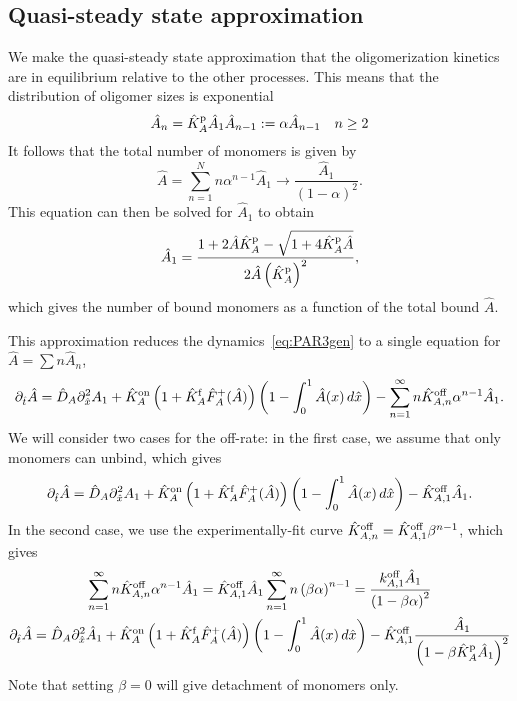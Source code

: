 \documentclass[11pt]{article}
\newcommand{\6}[1]{#1_{\text{6}}}
\newcommand{\3}[1]{#1_{\text{3}}}
\begin{document}
\subsection{Quasi-steady state approximation}
We make the quasi-steady state approximation \cite{lang2022oligomerization} that the oligomerization kinetics are in equilibrium relative to the other processes. This means that the distribution of oligomer sizes is exponential \cite{edelstein1998models,lang2022oligomerization}
\begin{equation}
\hat A_n =  \hat{K}^\text{p}_A \hat A_1 \hat A_{n-1}:=\alpha \hat A_{n-1} \quad n \geq 2
\end{equation}
It follows that the total number of monomers is given by 
\begin{equation}
\hat A = \sum_{n=1}^N n \alpha^{n-1} \hat A_1 \rightarrow \frac{\hat A_1}{\left(1-\alpha\right)^2}.
\end{equation}
This equation can then be solved for $\hat A_1$ to obtain \cite[Eq.~(12)]{lang2022oligomerization}
\begin{equation}
\label{eq:AmonA}
\hat A_1 = \frac{1+2\hat A \hat{K}^\text{p}_A-\sqrt{1+4 \hat{K}^\text{p}_A \hat A}}{2 \hat A \left(\hat{K}^\text{p}_A\right)^2},
\end{equation}
which gives the number of bound monomers as a function of the total bound $\hat A$. 

This approximation reduces the dynamics\ \eqref{eq:PAR3gen} to a single equation for $\hat A=\sum n \hat A_n$, 
\begin{equation}
\partial_{\hat{t}} \hat A = \hat{D}_A \partial_{\hat{x}}^2 A_1+\hat{K}^\text{on}_A \left(1+\hat{K}^\text{f}_A \hat F_A^+(\hat A) \right)\left(1 - \int_0^1 \hat A(x) \, d\hat{x} \right) - \sum_{n=1}^\infty n \hat{K}^\text{off}_{A,n}  \alpha^{n-1} \hat A_1.
\end{equation}
We will consider two cases for the off-rate: in the first case, we assume that only monomers can unbind, which gives \cite[Eq.~(14)]{lang2023oligomerization}
\begin{equation}
\partial_{\hat{t}} \hat A = \hat{D}_A \partial_{\hat{x}}^2 A_1+\hat{K}^\text{on}_A \left(1+\hat{K}^\text{f}_A \hat F_A^+(\hat A) \right)\left(1 - \int_0^1 \hat A(x) \, d\hat{x} \right) - \hat{K}^\text{off}_{A,1}  \hat A_1.
\end{equation}
In the second case, we use the experimentally-fit curve $\hat{K}^\text{off}_{A,n}=\hat{K}^\text{off}_{A,1} \beta^{n-1}$, which gives 
\begin{gather}
\sum_{n=1}^\infty n \hat{K}^\text{off}_{A,n}  \alpha^{n-1} \hat A_1 = \hat{K}^\text{off}_{A,1} \hat A_1 \sum_{n=1}^\infty n \left(\beta \alpha\right)^{n-1}= \frac{k^\text{off}_{A,1} \hat A_1}{\left(1-\beta \alpha\right)^2}\\
\partial_{\hat{t}} \hat A = \hat{D}_A \partial_{\hat{x}}^2 \hat A_1+\hat{K}^\text{on}_A \left(1+\hat{K}^\text{f}_A \hat F_A^+(\hat A) \right)\left(1 - \int_0^1 \hat A(x) \, d\hat{x} \right) - \hat{K}^\text{off}_{A,1}  \frac{\hat A_1}{\left(1-\beta \hat{K}^\text{p}_A \hat A_1\right)^2}
\end{gather}
Note that setting $\beta=0$ will give detachment of monomers only.
\end{document}
